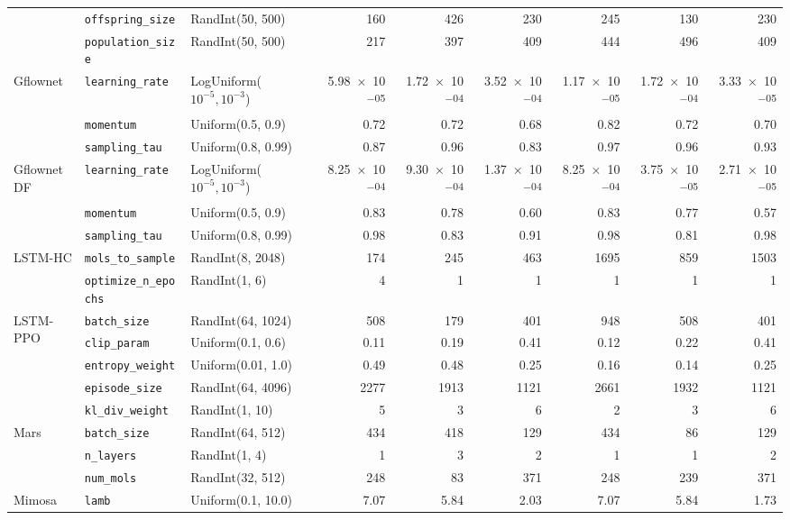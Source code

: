 \begin{tabular}{lllrrrrrr}
 & \texttt{offspring\_size} & RandInt(50, 500) & 160 & 426 & 230 & 245 & 130 & 230 \\
 & \texttt{population\_size} & RandInt(50, 500) & 217 & 397 & 409 & 444 & 496 & 409 \\
\midrule
\multirow[t]{3}{*}{Gflownet} & \texttt{learning\_rate} & LogUniform($10^{-5}, 10^{-3}$) & \num{5.98e-05} & \num{1.72e-04} & \num{3.52e-04} & \num{1.17e-05} & \num{1.72e-04} & \num{3.33e-05} \\
 & \texttt{momentum} & Uniform(0.5, 0.9) & 0.72 & 0.72 & 0.68 & 0.82 & 0.72 & 0.70 \\
 & \texttt{sampling\_tau} & Uniform(0.8, 0.99) & 0.87 & 0.96 & 0.83 & 0.97 & 0.96 & 0.93 \\
\midrule
\multirow[t]{3}{*}{GflownetDF} & \texttt{learning\_rate} & LogUniform($10^{-5}, 10^{-3}$) & \num{8.25e-04} & \num{9.30e-04} & \num{1.37e-04} & \num{8.25e-04} & \num{3.75e-05} & \num{2.71e-05} \\
 & \texttt{momentum} & Uniform(0.5, 0.9) & 0.83 & 0.78 & 0.60 & 0.83 & 0.77 & 0.57 \\
 & \texttt{sampling\_tau} & Uniform(0.8, 0.99) & 0.98 & 0.83 & 0.91 & 0.98 & 0.81 & 0.98 \\
\midrule
\multirow[t]{2}{*}{LSTM-HC} & \texttt{mols\_to\_sample} & RandInt(8, 2048) & 174 & 245 & 463 & 1695 & 859 & 1503 \\
 & \texttt{optimize\_n\_epochs} & RandInt(1, 6) & 4 & 1 & 1 & 1 & 1 & 1 \\
\midrule
\multirow[t]{5}{*}{LSTM-PPO} & \texttt{batch\_size} & RandInt(64, 1024) & 508 & 179 & 401 & 948 & 508 & 401 \\
 & \texttt{clip\_param} & Uniform(0.1, 0.6) & 0.11 & 0.19 & 0.41 & 0.12 & 0.22 & 0.41 \\
 & \texttt{entropy\_weight} & Uniform(0.01, 1.0) & 0.49 & 0.48 & 0.25 & 0.16 & 0.14 & 0.25 \\
 & \texttt{episode\_size} & RandInt(64, 4096) & 2277 & 1913 & 1121 & 2661 & 1932 & 1121 \\
 & \texttt{kl\_div\_weight} & RandInt(1, 10) & 5 & 3 & 6 & 2 & 3 & 6 \\
\midrule
\multirow[t]{3}{*}{Mars} & \texttt{batch\_size} & RandInt(64, 512) & 434 & 418 & 129 & 434 & 86 & 129 \\
 & \texttt{n\_layers} & RandInt(1, 4) & 1 & 3 & 2 & 1 & 1 & 2 \\
 & \texttt{num\_mols} & RandInt(32, 512) & 248 & 83 & 371 & 248 & 239 & 371 \\
\midrule
\multirow[t]{3}{*}{Mimosa} & \texttt{lamb} & Uniform(0.1, 10.0) & 7.07 & 5.84 & 2.03 & 7.07 & 5.84 & 1.73 \\

\end{tabular}
